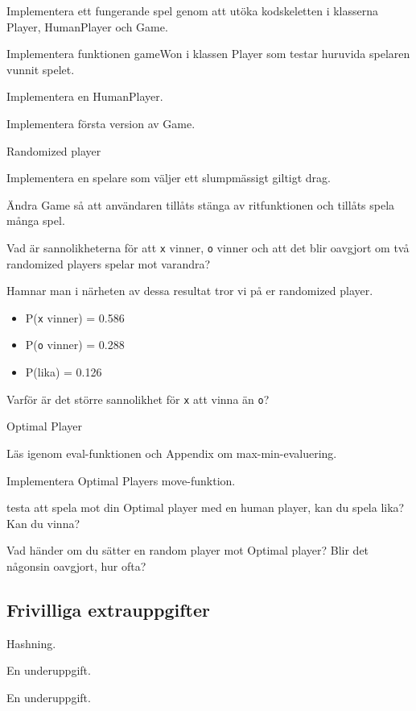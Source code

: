 \Task Implementera ett fungerande spel genom att utöka kodskeletten i klasserna Player, HumanPlayer och Game.

\Subtask Implementera funktionen gameWon i klassen Player som testar huruvida spelaren  vunnit spelet.

\Subtask Implementera en HumanPlayer.

\Subtask Implementera första version av Game.

\Task Randomized player

\Subtask Implementera en spelare som väljer ett slumpmässigt giltigt drag.

\Subtask Ändra Game så att användaren tillåts stänga av ritfunktionen och tillåts spela många spel.

\Subtask Vad är sannolikheterna för att \texttt{x} vinner, \texttt{o} vinner och att det blir oavgjort om två randomized players spelar mot varandra?

Hamnar man i närheten av dessa resultat tror vi på er randomized player.
\begin{itemize}
	\item P(\texttt{x} vinner) = 0.586
	\item P(\texttt{o} vinner) = 0.288
	\item P(lika) = 0.126
\end{itemize}


\Subtask Varför är det större sannolikhet för \texttt{x} att vinna än \texttt{o}?

\Task Optimal Player

\Subtask Läs igenom eval-funktionen och Appendix om max-min-evaluering.

\Subtask Implementera Optimal Players move-funktion.

\Subtask testa att spela mot din Optimal player med en human player, kan du spela lika? Kan du vinna?

\Subtask Vad händer om du sätter en random player mot Optimal player? Blir det någonsin oavgjort, hur ofta?

\subsection{Frivilliga extrauppgifter}

\Task Hashning.

\Subtask En underuppgift.

\Subtask En underuppgift.